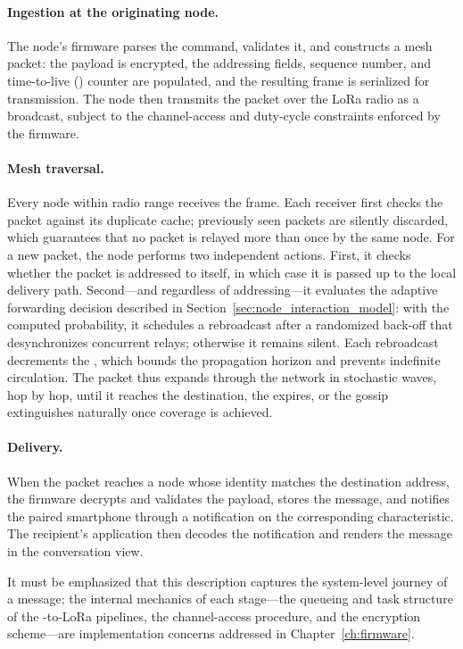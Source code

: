 \documentclass[english,bachelor]{tfgitic}[2026/01/22]
\begin{document}
\paragraph{Ingestion at the originating node.} The node's firmware parses the  command, validates it, and constructs a mesh packet: the payload is encrypted, the addressing fields, sequence number, and time-to-live () counter are populated, and the resulting frame is serialized for transmission. The node then transmits the packet over the LoRa radio as a broadcast, subject to the channel-access and duty-cycle constraints enforced by the firmware.

\paragraph{Mesh traversal.} Every node within radio range receives the frame. Each receiver first checks the packet against its duplicate cache; previously seen packets are silently discarded, which guarantees that no packet is relayed more than once by the same node. For a new packet, the node performs two independent actions. First, it checks whether the packet is addressed to itself, in which case it is passed up to the local delivery path. Second---and regardless of addressing---it evaluates the adaptive forwarding decision described in Section~\ref{sec:node_interaction_model}: with the computed probability, it schedules a rebroadcast after a randomized back-off that desynchronizes concurrent relays; otherwise it remains silent. Each rebroadcast decrements the , which bounds the propagation horizon and prevents indefinite circulation. The packet thus expands through the network in stochastic waves, hop by hop, until it reaches the destination, the  expires, or the gossip extinguishes naturally once coverage is achieved.

\paragraph{Delivery.} When the packet reaches a node whose identity matches the destination address, the firmware decrypts and validates the payload, stores the message, and notifies the paired smartphone through a  notification on the corresponding  characteristic. The recipient's application then decodes the notification and renders the message in the conversation view.

It must be emphasized that this description captures the system-level journey of a message; the internal mechanics of each stage---the queueing and task structure of the -to-LoRa pipelines, the channel-access procedure, and the encryption scheme---are implementation concerns addressed in Chapter~\ref{ch:firmware}.
\end{document}
